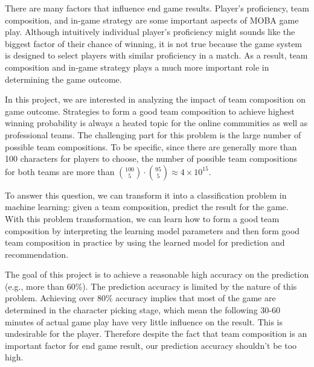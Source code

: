 \documentclass{article} %
\begin{document}
There are many factors that influence end game results. Player's proficiency, team composition, and in-game strategy are some important aspects of MOBA game play. Although intuitively individual player's proficiency might sounds like the biggest factor of their chance of winning, it is not true because the game system is designed to select players with similar proficiency in a match. As a result, team composition and in-game strategy plays a much more important role in determining the game outcome.

In this project, we are interested in analyzing the impact of team composition on game outcome. Strategies to form a good team composition to achieve highest winning probability is always a heated topic for the online communities as well as professional teams. The challenging part for this problem is the large number of possible team compositions. To be specific, since there are generally more than 100 characters for players
to choose, the number of possible team compositions for both teams are more than $\binom{100}{5}\cdot\binom{95}{5}\approx 4\times 10^{15}$.

To answer this question, we can transform it into a classification problem in machine learning: given a team composition, predict the result for the game. With this problem transformation, we can learn how to form a good team composition by interpreting the learning model parameters and then form good team composition in practice by using the learned model for prediction and recommendation.

The goal of this project is to achieve a reasonable high accuracy on the prediction (e.g., more than 60\%). The prediction accuracy is limited by the nature of this problem. Achieving over 80\% accuracy implies that most of the game are determined in the character picking stage, which mean the following 30-60 minutes of actual game play have very little influence on the result. This is undesirable for the player. Therefore despite the fact that team composition is an important factor for end game result, our prediction accuracy shouldn't be too high.



\end{document}
